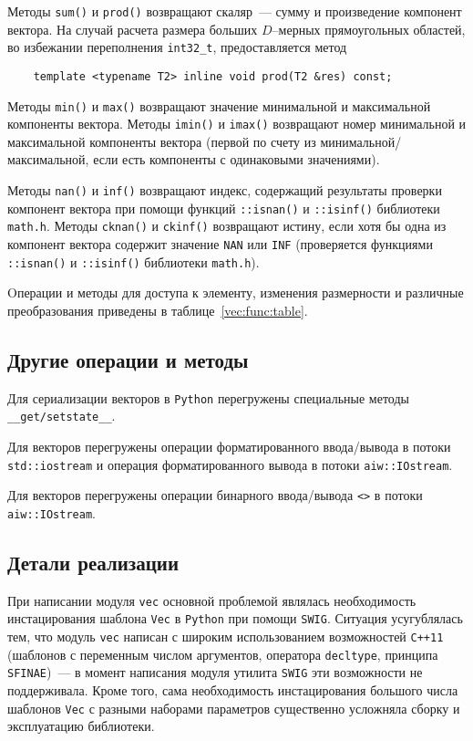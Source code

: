Методы \verb'sum()' и  \verb'prod()' возвращают скаляр~--- сумму и произведение компонент вектора. На случай расчета
размера больших $D$--мерных прямоугольных областей, во избежании переполнения \verb'int32_t', предоставляется метод
\begin{verbatim}
    template <typename T2> inline void prod(T2 &res) const;
\end{verbatim}

Методы \verb'min()' и \verb'max()' возвращают значение минимальной и максимальной компоненты вектора.
Методы \verb'imin()' и \verb'imax()' возвращают номер минимальной и максимальной компоненты вектора 
(первой по счету из минимальной/максимальной, если есть компоненты с одинаковыми значениями).

Методы \verb'nan()' и \verb'inf()' возвращают индекс, содержащий результаты проверки компонент вектора при помощи
функций \verb'::isnan()' и \verb'::isinf()' библиотеки {\tt math.h}.
Методы \verb'cknan()' и \verb'ckinf()' возвращают истину, если хотя бы одна из компонент вектора содержит значение
\verb'NAN' или \verb'INF' (проверяется функциями \verb'::isnan()' и \verb'::isinf()' библиотеки {\tt math.h}).

Oперации и методы для доступа к элементу, изменения размерности и различные преобразования приведены в таблице~\ref{vec:func:table}.

\subsection{Другие операции и методы}
Для сериализации векторов в {\tt Python} перегружены специальные методы \verb'__get/setstate__'.

Для векторов перегружены операции форматированного ввода/вывода в потоки \verb'std::iostream' и
операция форматированного вывода в потоки \verb'aiw::IOstream'. 

Для векторов перегружены операции бинарного ввода/вывода \verb'<>' в потоки \verb'aiw::IOstream'. 

\subsection{Детали реализации}
При написании модуля \verb'vec' основной проблемой  являлась необходимость 
инстацирования шаблона {\tt Vec} в {\tt Python} при помощи {\tt SWIG}.
Ситуация усугублялась тем, что  модуль {\tt vec} написан с широким использованием возможностей {\tt C++11}
(шаблонов с переменным числом аргументов, оператора \verb'decltype', принципа \verb'SFINAE')~--- 
в момент написания модуля утилита \verb'SWIG' эти возможности не поддерживала. 
Кроме того, сама необходимость инстацирования
большого числа шаблонов \verb'Vec' с разными наборами параметров существенно усложняла сборку и 
эксплуатацию библиотеки.

